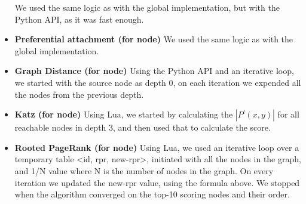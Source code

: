 \begin{itemize}
        We used the same logic as with the global implementation, but with the 
		Python API, as it was fast enough.
	\item {\bf Preferential attachment (for node)}
        We used the same logic as with the global implementation.
	\item {\bf Graph Distance (for node)}
        Using the Python API and an iterative loop, we started with the source 
		node as depth 0, on each iteration we expended all the nodes from the 
		previous depth.
	\item {\bf Katz (for node)}
        Using Lua, we started by calculating the $|P^l(x,y)|$ for all reachable 
		nodes in depth 3, and then used that to calculate the score.
	\item {\bf Rooted PageRank (for node)}
        Using Lua, we used an iterative loop over a temporary 
		table <id, rpr, new-rpr>, initiated with all the nodes in the graph, 
		and 1/N value where N is the number of nodes in the graph. On every 
        iteration we updated the new-rpr value, using the formula above. 
		We stopped when the algorithm converged on the top-10 scoring nodes 
		and their order.
\end{itemize}

